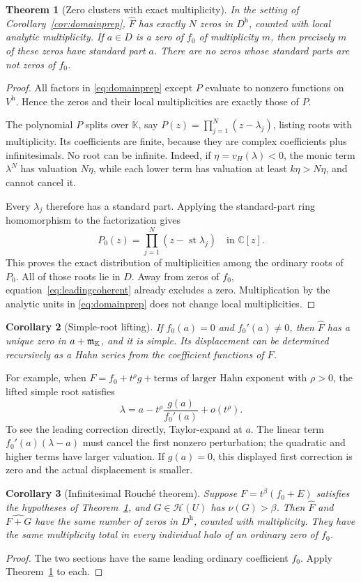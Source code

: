 \documentclass[11pt,a4paper]{article}
\newtheorem{theorem}{Theorem}[section]
\newtheorem{corollary}[theorem]{Corollary}
\theoremstyle{definition}\newtheorem{definition}[theorem]{Definition}
\theoremstyle{remark}\newtheorem{remark}[theorem]{Remark}
\newcommand{\K}{\mathbb K}
\newcommand{\C}{\mathbb C}\newcommand{\R}{\mathbb R}\newcommand{\N}{\mathbb N}\newcommand{\Z}{\mathbb Z}
\newcommand{\A}{\mathscr H}\newcommand{\hol}{\mathcal O}
\newcommand{\st}{\operatorname{st}}\newcommand{\supp}{\operatorname{supp}}
\newcommand{\ev}[1]{\widehat{#1}}
\newcommand{\vH}{v_H}
\newcommand{\halo}[1]{#1^{\mathrm h}}
\numberwithin{equation}{section}
\begin{document}
\begin{theorem}[Zero clusters with exact multiplicity]\label{thm:zerolift}
In the setting of Corollary~\ref{cor:domainprep}, $\ev F$ has exactly $N$ zeros in $\halo D$, counted with local analytic multiplicity. If $a\in D$ is a zero of $f_0$ of multiplicity $m$, then precisely $m$ of these zeros have standard part $a$. There are no zeros whose standard parts are not zeros of $f_0$.
\end{theorem}
\begin{proof}
All factors in \eqref{eq:domainprep} except $P$ evaluate to nonzero functions on $\halo V$. Hence the zeros and their local multiplicities are exactly those of $P$.

The polynomial $P$ splits over $\K$, say $P(z)=\prod_{j=1}^N(z-\lambda_j)$, listing roots with multiplicity. Its coefficients are finite, because they are complex coefficients plus infinitesimals. No root can be infinite. Indeed, if $\eta=\vH(\lambda)<0$, the monic term $\lambda^N$ has valuation $N\eta$, while each lower term has valuation at least $k\eta>N\eta$, and cannot cancel it.

Every $\lambda_j$ therefore has a standard part. Applying the standard-part ring homomorphism to the factorization gives
\[
 P_0(z)=\prod_{j=1}^N(z-\st\lambda_j)
 \quad\text{in }\C[z].
\]
This proves the exact distribution of multiplicities among the ordinary roots of $P_0$. All of those roots lie in $D$. Away from zeros of $f_0$, equation~\eqref{eq:leadingcoherent} already excludes a zero. Multiplication by the analytic units in \eqref{eq:domainprep} does not change local multiplicities.
\end{proof}

\begin{corollary}[Simple-root lifting]
If $f_0(a)=0$ and $f_0'(a)\ne0$, then $\ev F$ has a unique zero in $a+\infinit$, and it is simple. Its displacement can be determined recursively as a Hahn series from the coefficient functions of $F$.
\end{corollary}
For example, when $F=f_0+t^\rho g+\text{terms of larger Hahn exponent}$ with $\rho>0$, the lifted simple root satisfies
\[
 \lambda=a-t^\rho\frac{g(a)}{f_0'(a)}+o(t^\rho).
\]
To see the leading correction directly, Taylor-expand at $a$. The linear term $f_0'(a)(\lambda-a)$ must cancel the first nonzero perturbation; the quadratic and higher terms have larger valuation. If $g(a)=0$, this displayed first correction is zero and the actual displacement is smaller.

\begin{corollary}[Infinitesimal Rouch\'e theorem]\label{cor:infrouche}
Suppose $F=t^\beta(f_0+E)$ satisfies the hypotheses of Theorem~\ref{thm:zerolift}, and $G\in\A(U)$ has $\nu(G)>\beta$. Then $\ev F$ and $\ev{F+G}$ have the same number of zeros in $\halo D$, counted with multiplicity. They have the same multiplicity total in every individual halo of an ordinary zero of $f_0$.
\end{corollary}
\begin{proof}
The two sections have the same leading ordinary coefficient $f_0$. Apply Theorem~\ref{thm:zerolift} to each.
\end{proof}
\end{document}
